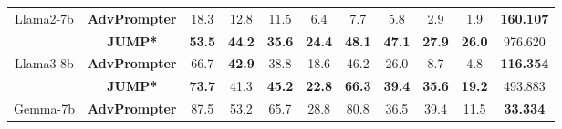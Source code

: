\begin{table*}[!t]
\begin{tabular}{ccccccccccc}
        \hline
        \multirow{2}{*}{Llama2-7b} & \textbf{AdvPrompter} & 18.3 & 12.8 & 11.5 & 6.4 & 7.7 & 5.8 & 2.9 & 1.9 & \textbf{160.107} \\ %
            & \textbf{JUMP*} & \textbf{53.5} & \textbf{44.2} & \textbf{35.6} & \textbf{24.4} & \textbf{48.1} & \textbf{47.1} & \textbf{27.9} & \textbf{26.0} & 976.620 \\ 
        \hline
        \multirow{2}{*}{Llama3-8b} & \textbf{AdvPrompter} & 66.7 & \textbf{42.9} & 38.8 & 18.6 & 46.2 & 26.0 & 8.7 & 4.8 & \textbf{116.354} \\ %
            & \textbf{JUMP*} & \textbf{73.7} & 41.3 & \textbf{45.2} & \textbf{22.8} & \textbf{66.3} & \textbf{39.4} & \textbf{35.6} & \textbf{19.2} & 493.883 \\
        \hline
        \multirow{2}{*}{Gemma-7b} & \textbf{AdvPrompter} & 87.5 & 53.2 & 65.7 & 28.8 & 80.8 & 36.5 & 39.4 & 11.5 & \textbf{33.334} \\ %

\end{tabular}
\end{table*}
